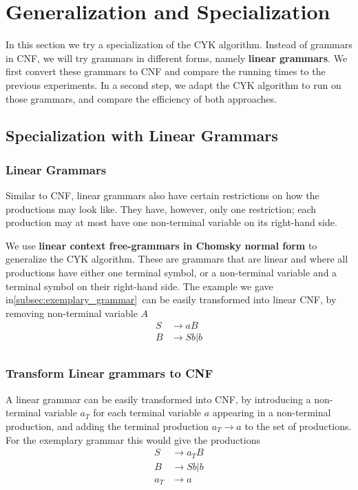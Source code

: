 \section{Generalization and Specialization}

In this section we try a specialization of the CYK algorithm. 
Instead of grammars in CNF, we will try grammars in different forms, namely \textbf{linear grammars}.
We first convert these grammars to CNF and compare the running times to the previous experiments.
In a second step, we adapt the CYK algorithm to run on those grammars, and compare the efficiency of both approaches.

\subsection{Specialization with Linear Grammars}

\subsubsection{Linear Grammars}
Similar to CNF, linear grammars also have certain restrictions on how the productions may look like.
They have, however, only one restriction; each production may at most have one non-terminal variable on its right-hand side.

We use \textbf{linear context free-grammars in Chomsky normal form} to generalize the CYK algorithm.
These are grammars that are linear and where all productions have either one terminal symbol, or a non-terminal variable and a terminal symbol on their right-hand side.
The example we gave in\ref{subsec:exemplary_grammar}~can be easily transformed into linear CNF, by removing non-terminal variable $A$
\begin{align*}
    S&\rightarrow aB \\
    B&\rightarrow Sb|b \\
\end{align*}


\subsubsection{Transform Linear grammars to CNF}
A linear grammar can be easily transformed into CNF, by introducing a non-terminal variable $a_T$ for each terminal variable $a$ appearing in a non-terminal production, and adding the terminal production $a_T\rightarrow a$ to the set of productions.
For the exemplary grammar this would give the productions
\begin{align*}
    S&\rightarrow a_T B \\
    B&\rightarrow Sb|b \\
    a_T&\rightarrow a
\end{align*}

